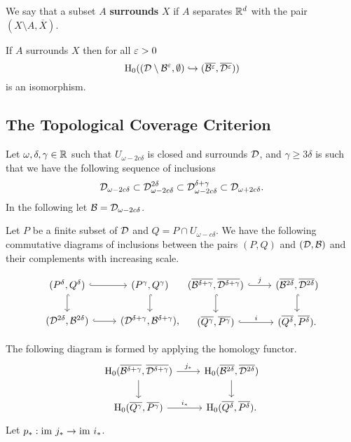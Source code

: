 We say that a subset $A$ \textbf{surrounds} $X$ if $A$ separates $\mathbb{R}^d$ with the pair $(X\setminus A, \overline{X})$.

\begin{lemma}\label{lem:surrounds}
    If $A$ surrounds $X$ then for all $\varepsilon > 0$
    \[\mathrm{H}_0(({\mathcal{D}}\setminus{\mathcal{B}}^\varepsilon,\emptyset)\hookrightarrow (\overline{{\mathcal{B}}^\varepsilon}, \overline{{\mathcal{D}}^\varepsilon}))\]
    is an isomorphism.
\end{lemma}

\subsection{The Topological Coverage Criterion}

Let $\omega,\delta,\gamma \in \mathbb{R}$ such that $U_{\omega-2c\delta}$ is closed and surrounds ${\mathcal{D}}$, and $\gamma \geq 3\delta$ is such that we have the following sequence of inclusions
\[{\mathcal{D}}_{\omega - 2c\delta}\subset {\mathcal{D}}_{\omega - 2c\delta}^{2\delta} \subset {\mathcal{D}}_{\omega - 2c\delta}^{\delta + \gamma} \subset {\mathcal{D}}_{\omega + 2c\delta}.\]
In the following let ${\mathcal{B}} = {\mathcal{D}}_{\omega - 2c\delta}$.

Let $P$ be a finite subset of ${\mathcal{D}}$ and $Q = P\cap U_{\omega - c\delta}$.
We have the following commutative diagrams of inclusions between the pairs $(P,Q)$ and $({\mathcal{D}}, {\mathcal{B}})$ and their complements with increasing scale.

\[ \begin{tikzcd}
(P^\delta, Q^\delta) \arrow[hookrightarrow]{r}\arrow[hookrightarrow]{d}& (P^\gamma, Q^\gamma) \arrow[hookrightarrow]{d} \\%
(\D^{2\delta}, \B^{2\delta}) \arrow[hookrightarrow]{r} & (\D^{\delta+\gamma}, \B^{\delta+\gamma}),
\end{tikzcd}
\begin{tikzcd}
(\overline{\B^{\delta+\gamma}}, \overline{\D^{\delta+\gamma}})\arrow[hookrightarrow]{r}{j}\arrow[hookrightarrow]{d}& (\overline{\B^{2\delta}}, \overline{\D^{2\delta}}) \arrow[hookrightarrow]{d} \\%
(\overline{Q^\gamma}, \overline{P^\gamma}) \arrow[hookrightarrow]{r}{i} & (\overline{Q^\delta}, \overline{P^\delta}).
\end{tikzcd}\]

The following diagram is formed by applying the homology functor.
\[ \begin{tikzcd}\label{dgm:1}
\hom_0(\overline{\B^{\delta+\gamma}}, \overline{\D^{\delta+\gamma}})\arrow{r}{j_*}\arrow{d}& \hom_0(\overline{\B^{2\delta}}, \overline{\D^{2\delta}}) \arrow{d} \\%
\hom_0(\overline{Q^\gamma}, \overline{P^\gamma}) \arrow{r}{i_*} & \hom_0(\overline{Q^\delta}, \overline{P^\delta}).
\end{tikzcd}\]
Let $p_* : \mathrm{im}~j_*\to\mathrm{im}~i_*$.

